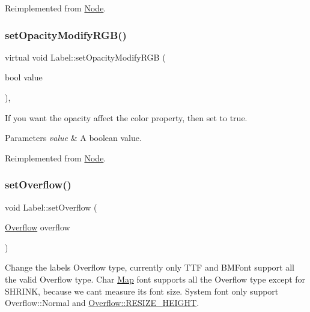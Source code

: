 Reimplemented from \hyperlink{classNode_a978c5435ab23f76e9efdf0f7e9e288e5}{Node}.

\mbox{\label{classLabel_a29fe05b89ed819988763ae013ca8fe48}} 
\subsubsection{\texorpdfstring{set\+Opacity\+Modify\+R\+G\+B()}{setOpacityModifyRGB()}\hspace{0.1cm}{\footnotesize\ttfamily [2/2]}}
{\footnotesize\ttfamily virtual void Label\+::set\+Opacity\+Modify\+R\+GB (\begin{DoxyParamCaption}\item[{bool}]{value }\end{DoxyParamCaption})\hspace{0.3cm}{\ttfamily [override]}, {\ttfamily [virtual]}}

If you want the opacity affect the color property, then set to true. 
\begin{DoxyParams}{Parameters}
{\em value} & A boolean value. \\
\hline
\end{DoxyParams}


Reimplemented from \hyperlink{classNode_a978c5435ab23f76e9efdf0f7e9e288e5}{Node}.

\mbox{\label{classLabel_a50e5693d5ad8c240aa7178a000ad5f20}} 
\subsubsection{\texorpdfstring{set\+Overflow()}{setOverflow()}\hspace{0.1cm}{\footnotesize\ttfamily [1/2]}}
{\footnotesize\ttfamily void Label\+::set\+Overflow (\begin{DoxyParamCaption}\item[{\hyperlink{classLabel_af7d31998ea743e8ca64eb1a983fa6a4c}{Overflow}}]{overflow }\end{DoxyParamCaption})}

Change the label\textquotesingle{}s Overflow type, currently only T\+TF and B\+M\+Font support all the valid Overflow type. Char \hyperlink{classMap}{Map} font supports all the Overflow type except for S\+H\+R\+I\+NK, because we can\textquotesingle{}t measure it\textquotesingle{}s font size. System font only support Overflow\+::\+Normal and \hyperlink{classLabel_af7d31998ea743e8ca64eb1a983fa6a4ca25ddd126af75d0a6b8e195603cad17eb}{Overflow\+::\+R\+E\+S\+I\+Z\+E\+\_\+\+H\+E\+I\+G\+HT}.


